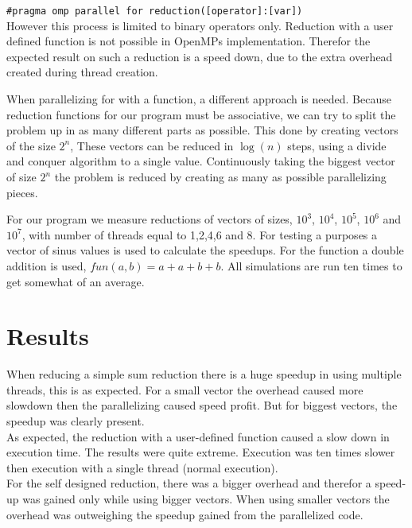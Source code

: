 \documentclass[a4paper,12px]{article}
\begin{document}
\texttt{\#pragma omp parallel for reduction([operator]:[var])}\\

However this process is limited to binary operators only. Reduction with a user
defined function is not possible in OpenMPs implementation. Therefor the
expected result on such a reduction is a speed down, due to the extra overhead
created during thread creation.

When parallelizing for with a function, a different approach is needed. Because
reduction functions for our program must be associative, we can try to split the
problem up in as many different parts as possible. This done by creating vectors
of the size $2^n$, These vectors can be reduced in $\log(n)$ steps, using a
divide and conquer algorithm to a single value. Continuously taking the biggest
vector of size $2^n$ the problem is reduced by creating as many as possible
parallelizing pieces.

For our program we measure reductions of vectors of sizes, $10^3$, $10^4$,
$10^5$, $10^6$ and $10^7$, with number of threads equal to 1,2,4,6 and 8. For
testing a purposes a vector of sinus values is used to calculate the speedups.
For the function a double addition is used, $fun(a,b) = a+a+b+b$. All
simulations are run ten times to get somewhat of an average.

\section{Results}

When reducing a simple sum reduction there is a huge speedup in using multiple
threads, this is as expected. For a small vector the overhead caused more
slowdown then the parallelizing caused speed profit. But for biggest vectors,
the speedup was clearly present.\\

As expected, the reduction with a user-defined function caused a slow down in
execution time. The results were quite extreme. Execution was ten times slower
then execution with a single thread (normal execution).\\

For the self designed reduction, there was a bigger overhead and therefor a
speed-up was gained only while using bigger vectors. When using smaller vectors
the overhead was outweighing the speedup gained from the parallelized code.
\end{document}
